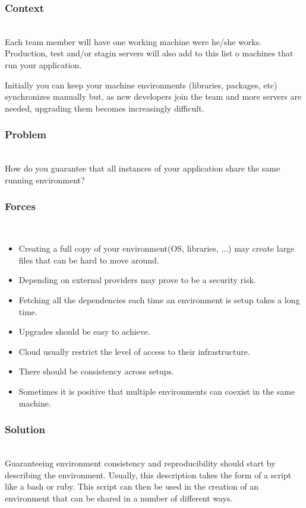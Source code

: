 \documentclass{llncs}
\begin{document}
		\subsubsection{Context}~\\
			Each team member will have one working machine were he/she works. Production, test and/or stagin servers will also add to this list o machines that run your application.

			Initially you can keep your machine environments (libraries, packages, etc) synchronizes manually but, as new developers join the team and more servers are needed, upgrading them becomes increasingly difficult.

  		\subsubsection{Problem}~\\
			How do you guarantee that all instances of your application share the same running environment?
		\subsubsection{Forces}~\\
			\begin{itemize}
				\item Creating a full copy of your environment(OS, libraries, ...) may create large files that can be hard to move around.
				\item Depending on external providers may prove to be a security risk.
				\item Fetching all the dependencies each time an environment is setup takes a long time.
				\item Upgrades should be easy to achieve.
				\item Cloud usually restrict the level of access to their infrastructure.
				\item There should be consistency across setups.
				\item Sometimes it is positive that multiple environments can coexist in the same machine.
			\end{itemize}
		\subsubsection{Solution}~\\
			Guaranteeing environment consistency and reproducibility should start by describing the environment. Usually, this description takes the form of a script like a bash or ruby. This script can then be used in the creation of an environment that can be shared in a number of different ways.
\end{document}
